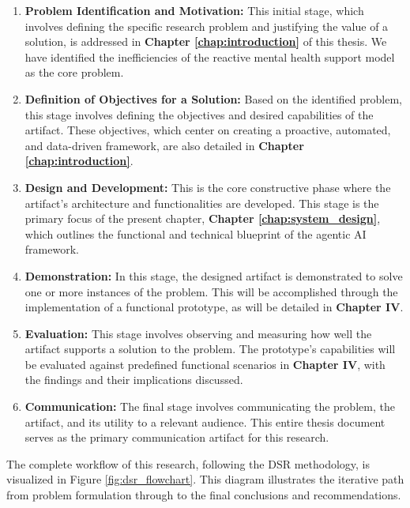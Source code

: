 \begin{enumerate}
    \item \textbf{Problem Identification and Motivation:} This initial stage, which involves defining the specific research problem and justifying the value of a solution, is addressed in \textbf{Chapter \ref{chap:introduction}} of this thesis. We have identified the inefficiencies of the reactive mental health support model as the core problem.

    \item \textbf{Definition of Objectives for a Solution:} Based on the identified problem, this stage involves defining the objectives and desired capabilities of the artifact. These objectives, which center on creating a proactive, automated, and data-driven framework, are also detailed in \textbf{Chapter \ref{chap:introduction}}.

    \item \textbf{Design and Development:} This is the core constructive phase where the artifact's architecture and functionalities are developed. This stage is the primary focus of the present chapter, \textbf{Chapter \ref{chap:system_design}}, which outlines the functional and technical blueprint of the agentic AI framework.

    \item \textbf{Demonstration:} In this stage, the designed artifact is demonstrated to solve one or more instances of the problem. This will be accomplished through the implementation of a functional prototype, as will be detailed in \textbf{Chapter IV}.

    \item \textbf{Evaluation:} This stage involves observing and measuring how well the artifact supports a solution to the problem. The prototype's capabilities will be evaluated against predefined functional scenarios in \textbf{Chapter IV}, with the findings and their implications discussed.

    \item \textbf{Communication:} The final stage involves communicating the problem, the artifact, and its utility to a relevant audience. This entire thesis document serves as the primary communication artifact for this research.
\end{enumerate}

The complete workflow of this research, following the DSR methodology, is visualized in Figure \ref{fig:dsr_flowchart}. This diagram illustrates the iterative path from problem formulation through to the final conclusions and recommendations.

